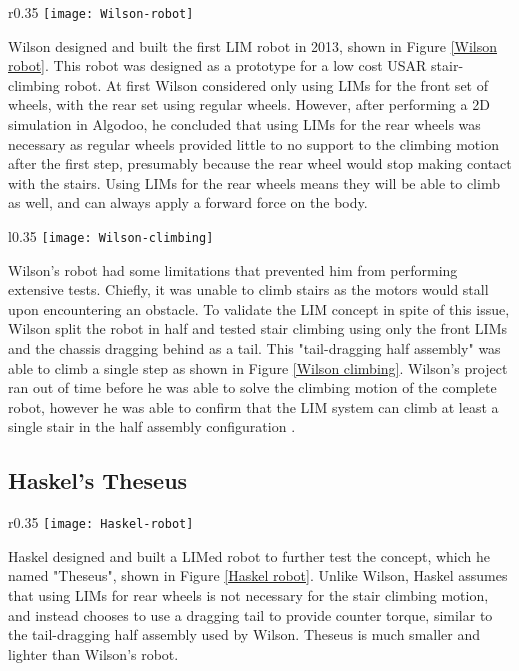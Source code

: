 \begin{wrapfigure}{r}{0.35\textwidth}
	\centering
	\texttt{[image: Wilson-robot]}
	\caption{Wilson's Robot \citep{Wilson-2013}}
	\label{Wilson robot}
\end{wrapfigure}

Wilson designed and built the first LIM robot in 2013, shown in Figure \ref{Wilson robot}. This robot was designed as a prototype for a low cost USAR stair-climbing robot. At first Wilson considered only using LIMs for the front set of wheels, with the rear set using regular wheels. However, after performing a 2D simulation in Algodoo, he concluded that using LIMs for the rear wheels was necessary as regular wheels provided little to no support to the climbing motion after the first step, presumably because the rear wheel would stop making contact with the stairs. Using LIMs for the rear wheels means they will be able to climb as well, and can always apply a forward force on the body.



\begin{wrapfigure}{l}{0.35\textwidth}
	\centering
	\texttt{[image: Wilson-climbing]}
	\caption{Wilson's half assembly climbing a stair \citep{Wilson-2013}}
	\label{Wilson climbing}
\end{wrapfigure}

Wilson's robot had some limitations that prevented him from performing extensive tests. Chiefly, it was unable to climb stairs as the motors would stall upon encountering an obstacle. To validate the LIM concept in spite of this issue, Wilson split the robot in half and tested stair climbing using only the front LIMs and the chassis dragging behind as a tail. This "tail-dragging half assembly" was able to climb a single step as shown in Figure \ref{Wilson climbing}. Wilson's project ran out of time before he was able to solve the climbing motion of the complete robot, however he was able to confirm that the LIM system can climb at least a single stair in the half assembly configuration \citep{Wilson-2013}.

\subsection{Haskel's Theseus} %

\begin{wrapfigure}{r}{0.35\textwidth}
	\centering
	\texttt{[image: Haskel-robot]}
	\caption{Haskel's Theseus \citep{Haskel-2017}}
	\label{Haskel robot}
\end{wrapfigure}
Haskel designed and built a LIMed robot to further test the concept, which he named "Theseus", shown in Figure \ref{Haskel robot}. Unlike Wilson, Haskel assumes that using LIMs for rear wheels is not necessary for the stair climbing motion, and instead chooses to use a dragging tail to provide counter torque, similar to the tail-dragging half assembly used by Wilson. Theseus is much smaller and lighter than Wilson's robot.\\

